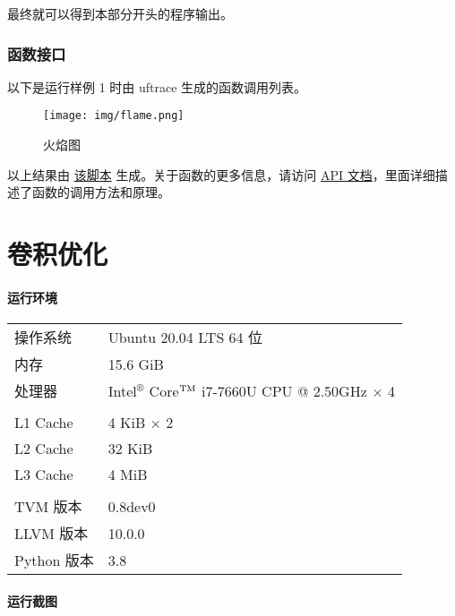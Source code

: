 \documentclass[UTF8]{ctexart}
\begin{document}
最终就可以得到本部分开头的程序输出。

\section{函数接口}

以下是运行样例 1 时由 uftrace\cite{uft} 生成的函数调用列表。


\begin{figure}[H]
    \centering
        \texttt{[image: img/flame.png]}
    \caption{火焰图\cite{flame}}
    \label{fig:flame}
\end{figure}

以上结果由 \href{run:../opg/uftrace.sh}{该脚本} 生成。关于函数的更多信息，请访问 \href{run:../opg/target/doc/opg/index.html}{API 文档}，里面详细描述了函数的调用方法和原理。%

\vspace*{5em}

\part{卷积优化}
\subsection*{运行环境}
\begin{tabular}{ll}
    操作系统 & Ubuntu 20.04 LTS 64 位\\
    内存 & 15.6 GiB \\
    处理器 & Intel$^\circledR$ Core$^{\rm TM}$ i7-7660U CPU @ 2.50GHz $\times$ 4\\
    &\\
    L1 Cache & 4 KiB $\times$ 2 \\
    L2 Cache & 32 KiB \\
    L3 Cache & 4 MiB \\
    &\\
    TVM 版本 & 0.8dev0 \\
    LLVM 版本 & 10.0.0 \\
    Python 版本 & 3.8 \\
\end{tabular}

\subsection*{运行截图}
\begin{figure}[H]
    \centering
\end{figure}
\end{document}
